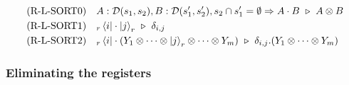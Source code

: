 \begin{align*}
    & \textrm{(R-L-SORT0)}
    && A : \mathcal{D}(s_1, s_2), B : \mathcal{D}(s_1', s_2'), s_2 \cap s_1'=\emptyset \Rightarrow A \cdot B \ \triangleright\ A \otimes B \\
    & \textrm{(R-L-SORT1)}
    && {}_r\bra{i}\cdot\ket{j}_r \ \triangleright\ \delta_{i, j} \\
    & \textrm{(R-L-SORT2)}
    && {}_r\bra{i}\cdot(Y_1 \otimes \cdots \otimes \ket{j}_r \otimes \cdots \otimes Y_m) \ \triangleright\ \delta_{i, j}.(Y_1  \otimes \cdots \otimes Y_m) \\
\end{align*}

\subsubsection*{Eliminating the registers}

